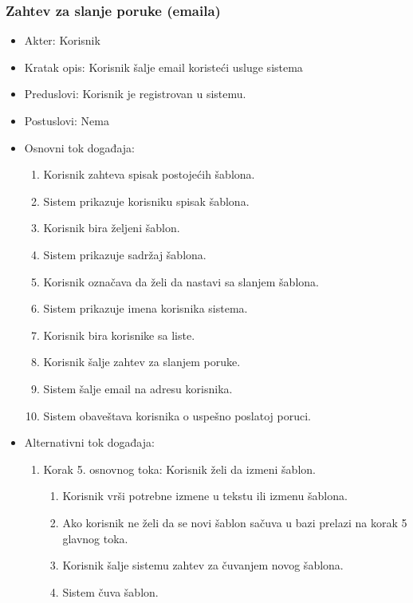 \documentclass[a4paper]{article}
\begin{document}
\subsubsection{Zahtev za slanje poruke (emaila)}
\begin{itemize}
    \item Akter: Korisnik
    \item Kratak opis: Korisnik šalje email koristeći usluge sistema
    \item Preduslovi: Korisnik je registrovan u sistemu.
    \item Postuslovi: Nema
    \item Osnovni tok događaja:
        \begin{enumerate}
            \item Korisnik zahteva spisak postojećih šablona.
            \item Sistem prikazuje korisniku spisak šablona.
            \item Korisnik bira željeni šablon.
            \item Sistem prikazuje sadržaj šablona.
            \item Korisnik označava da želi da nastavi sa slanjem šablona.
            \item Sistem prikazuje imena korisnika sistema.
            \item Korisnik bira korisnike sa liste.
            \item Korisnik šalje zahtev za slanjem poruke.
            \item Sistem šalje email na adresu korisnika.
            \item Sistem obaveštava korisnika o uspešno poslatoj poruci.
        \end{enumerate}
    \item Alternativni tok događaja:
        \begin{enumerate}
            \item Korak 5. osnovnog toka: Korisnik želi da izmeni šablon.
            \begin{enumerate}
                \item Korisnik vrši potrebne izmene u tekstu ili izmenu šablona.
                \item Ako korisnik ne želi da se novi šablon sačuva u bazi prelazi na korak 5 glavnog toka.
                \item Korisnik šalje sistemu zahtev za čuvanjem novog šablona.
                \item Sistem čuva šablon.

\end{enumerate}
\end{enumerate}
\end{itemize}
\end{document}
